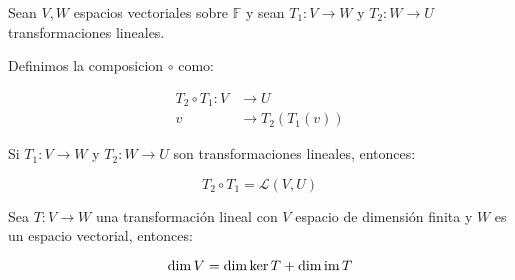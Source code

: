 		\begin{definicion}
			Sean $V, W$ espacios vectoriales sobre $\mathbb{F}$ y sean $T_1 \colon V \to W$ y $T_2 \colon W \to U$ transformaciones lineales.

			Definimos la composicion $\circ$ como:

			\begin{align}
				T_2 \circ T_1 \colon V &\to U \nonumber \\
				v &\to T_2(T_1(v))
			\end{align}
		\end{definicion}

		\begin{proposicion}
			Si $T_1 \colon V \to W$ y $T_2 \colon W \to U$ son transformaciones lineales, entonces:

			\begin{equation}
				T_2 \circ T_1 = \mathcal{L}(V, U)
			\end{equation}
		\end{proposicion}

		\begin{teorema}
			Sea $T \colon V \to W$ una transformación lineal con $V$ espacio de dimensión finita y $W$ es un espacio vectorial, entonces:

			\begin{equation}
				\dim{V} = \dim{\ker{T}} + \dim{\operatorname{im}{T}}
			\end{equation}
		\end{teorema}

